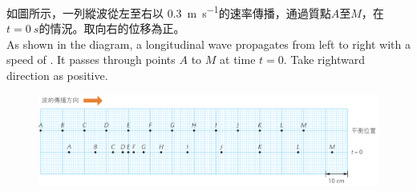 {
    如圖所示，一列縱波從左至右以 \qty{0.3}{m.s^{-1}}的速率傳播，通過質點$A$至$M$，在$t=\qty{0}{s}$的情況。取向右的位移為正。\\As shown in the diagram, a longitudinal wave propagates from left to right with a speed of . It passes through points $A$ to $M$ at time $t = 0$. Take rightward direction as positive.
    \begin{figure}[h!]
        \centering
        \includegraphics[width=\textwidth]{assets/da6d903d.png}
    \end{figure}
    }
